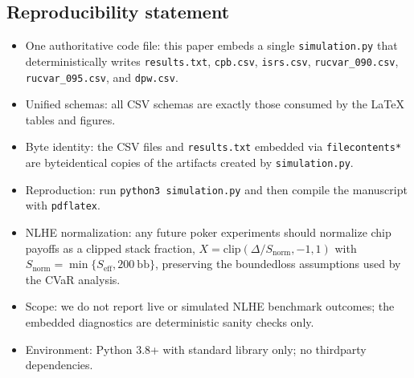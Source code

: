 \subsection*{Reproducibility statement}
\begin{itemize}
\item One authoritative code file: this paper embeds a single \texttt{simulation.py} that deterministically writes \texttt{results.txt}, \texttt{cpb.csv}, \texttt{isrs.csv}, \texttt{rucvar\_090.csv}, \texttt{rucvar\_095.csv}, and \texttt{dpw.csv}.
\item Unified schemas: all CSV schemas are exactly those consumed by the LaTeX tables and figures.
\item Byte identity: the CSV files and \texttt{results.txt} embedded via \texttt{filecontents*} are byte\textendash identical copies of the artifacts created by \texttt{simulation.py}.
\item Reproduction: run \texttt{python3 simulation.py} and then compile the manuscript with \texttt{pdflatex}.
\item NLHE normalization: any future poker experiments should normalize chip payoffs as a clipped stack fraction, $X=\mathrm{clip}(\Delta/S_{\mathrm{norm}},-1,1)$ with $S_{\mathrm{norm}}=\min\{S_{\mathrm{eff}},200\ \text{bb}\}$, preserving the bounded\textendash loss assumptions used by the CVaR analysis.
\item Scope: we do not report live or simulated NLHE benchmark outcomes; the embedded diagnostics are deterministic sanity checks only.
\item Environment: Python 3.8+ with standard library only; no third\textendash party dependencies.
\end{itemize}

\begin{center}
\begin{minipage}{0.96\linewidth}
\scriptsize

\end{minipage}
\end{center}

